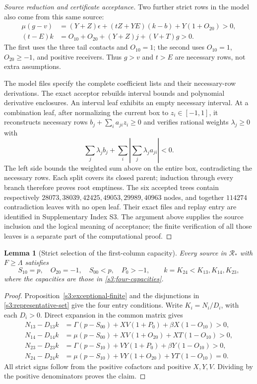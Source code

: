 \documentclass[11pt,reqno]{amsart}
\newtheorem{lemma}[theorem]{Lemma}
\theoremstyle{definition}
\theoremstyle{remark}
\begin{document}
\begin{proof}[Source reduction and certificate acceptance]
Two further strict rows in the model also come from this same source:
\[
\begin{aligned}
 \mu(g-v)&=(Y+Z)\epsilon+(tZ+YE)(k-b)+Y(1+O_{20})>0,\\
 (t-E)k&=O_{10}+O_{20}+(Y+Z)j+(V+T)g>0.
\end{aligned}
\]
The first uses the three tail contacts and \(O_{10}=1\); the second
uses \(O_{10}=1\), \(O_{20}\ge-1\), and positive receivers.
Thus \(g>v\) and \(t>E\) are necessary rows, not extra assumptions.

The model files specify the complete coefficient lists and their
necessary-row derivations. The exact acceptor rebuilds interval
bounds and polynomial derivative enclosures. An interval leaf
exhibits an empty necessary interval. At a combination leaf, after
normalizing the current box to \(z_i\in[-1,1]\), it reconstructs
necessary rows \(b_j+\sum_i a_{ji}z_i\ge0\) and verifies rational
weights \(\lambda_j\ge0\) with
\[
 \sum_j\lambda_jb_j+
 \sum_i\left|\sum_j\lambda_ja_{ji}\right|<0.
\]
The left side bounds the weighted sum above on the entire box,
contradicting the necessary rows. Each split covers its closed parent;
induction through every branch therefore proves root emptiness.
The six accepted trees contain respectively
\(28073,38039,42425,49053,29989,40963\) nodes, and together
\(114274\) contradiction leaves with no open leaf.
Their exact files and replay entry are identified in Supplementary
Index S3. The argument above supplies the source inclusion and the
logical meaning of acceptance; the finite verification of all those
leaves is a separate part of the computational proof.
\end{proof}

\begin{lemma}[Strict selection of the first-column capacity]
\label{s3:strict-K24}
Every source in \(\mathcal R_*\) with \(F\ge\Lambda\) satisfies
\[
 S_{10}=p,\quad O_{20}=-1,\quad S_{00}<p,\quad P_0>-1,
 \qquad k=K_{24}<K_{13},K_{14},K_{23},
\]
where the capacities are those in \eqref{s3:four-capacities}.
\end{lemma}
\begin{proof}
Proposition~\ref{s3:exceptional-finite} and the disjunctions in
\eqref{s3:representative-set} give the four entry conditions.
Write \(K_i=N_i/D_i\), with each \(D_i>0\). Direct expansion
in the common matrix gives
\[
\begin{aligned}
 N_{13}-D_{13}k
 &=\Gamma(p-S_{00})+XV(1+P_0)+\beta X(1-O_{10})>0,\\
 N_{14}-D_{14}k
 &=\mu(p-S_{00})+XV(1+O_{20})+XT(1-O_{10})>0,\\
 N_{23}-D_{23}k
 &=\Gamma(p-S_{10})+VY(1+P_0)+\beta Y(1-O_{10})>0,\\
 N_{24}-D_{24}k
 &=\mu(p-S_{10})+VY(1+O_{20})+YT(1-O_{10})=0.
\end{aligned}
\]
All strict signs follow from the positive cofactors and positive
\(X,Y,V\). Dividing by the positive denominators proves the claim.
\end{proof}
\end{document}
